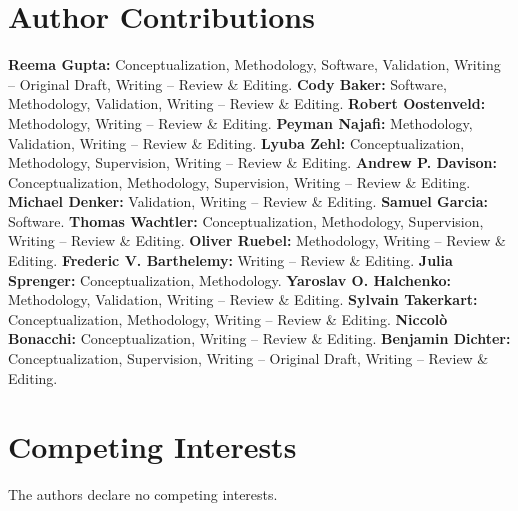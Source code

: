 \documentclass[fleqn,10pt]{article}
\begin{document}
\section*{Author Contributions}
\textbf{Reema Gupta:} Conceptualization, Methodology, Software, Validation, Writing -- Original Draft, Writing -- Review \& Editing.
\textbf{Cody Baker:} Software, Methodology, Validation, Writing -- Review \& Editing.
\textbf{Robert Oostenveld:} Methodology, Writing -- Review \& Editing.
\textbf{Peyman Najafi:} Methodology, Validation, Writing -- Review \& Editing.
\textbf{Lyuba Zehl:} Conceptualization, Methodology, Supervision, Writing -- Review \& Editing.
\textbf{Andrew P. Davison:} Conceptualization, Methodology, Supervision, Writing -- Review \& Editing.
\textbf{Michael Denker:} Validation, Writing -- Review \& Editing.
\textbf{Samuel Garcia:} Software.
\textbf{Thomas Wachtler:} Conceptualization, Methodology, Supervision, Writing -- Review \& Editing.
\textbf{Oliver Ruebel:} Methodology, Writing -- Review \& Editing.
\textbf{Frederic V. Barthelemy:} Writing -- Review \& Editing.
\textbf{Julia Sprenger:} Conceptualization, Methodology.
\textbf{Yaroslav O. Halchenko:} Methodology, Validation, Writing -- Review \& Editing.
\textbf{Sylvain Takerkart:} Conceptualization, Methodology, Writing -- Review \& Editing.
\textbf{Niccolò Bonacchi:} Conceptualization, Writing -- Review \& Editing.
\textbf{Benjamin Dichter:} Conceptualization, Supervision, Writing -- Original Draft, Writing -- Review \& Editing.


\section*{Competing Interests}
The authors declare no competing interests.


\end{document}
